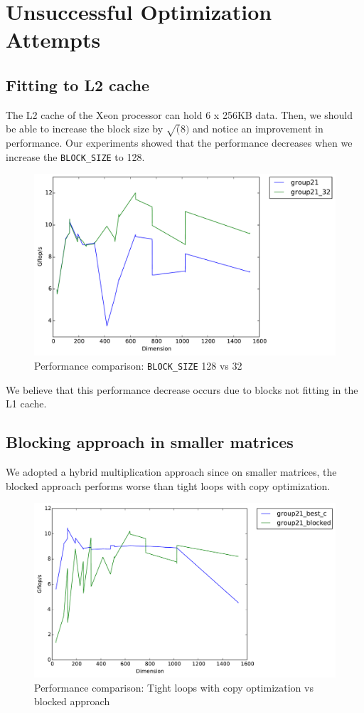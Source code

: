 \documentclass[11pt]{article}
\begin{document}
\section{Unsuccessful Optimization Attempts}
\subsection{Fitting to L2 cache}
The L2 cache of the Xeon processor can hold 6 x 256KB data. Then, we should be able to increase the block size by $\sqrt(8)$ and notice an improvement in performance. Our experiments showed that the performance decreases when we increase the \texttt{BLOCK\_SIZE} to 128.  

\begin{figure}[H]
\centering
\includegraphics[scale=0.6]{128_32.pdf}
\caption{Performance comparison: \texttt{BLOCK\_SIZE} 128 vs 32}
\end{figure}

We believe that this performance decrease occurs due to blocks not fitting in the L1 cache.

\subsection{Blocking approach in smaller matrices}
We adopted a hybrid multiplication approach since on smaller matrices, the blocked approach performs worse than tight loops with copy optimization. 

\begin{figure}[H]
\centering
\label{blocked_spiky}
\includegraphics[scale=0.6]{blocked_small.pdf}
\caption{Performance comparison: Tight loops with copy optimization vs blocked approach}
\end{figure}
\end{document}
